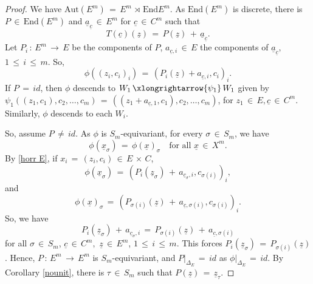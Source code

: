 \documentclass[12pt,reqno]{amsart}
\theoremstyle{definition}
\numberwithin{equation}{section}
\begin{document}
\begin{proof}
We have $\textrm{Aut}(E^{m})\,=\, E^{m}\,\rtimes\,\textrm{End}E^{m}$. As $\textrm{End}(E^{m})$ is discrete, there is $P\,\in\, \textrm{End}(E^{m})$ and  $\underline{a}_{\underline{c}}\,\in\, E^{m}$ for $\underline{c}\,\in\, C^{m}$ such that 
\begin{equation*}
T(\underline{c})(\underline{z})\,=\, P(\underline{z})\,+\, \underline{a}_{\underline{c}}.  
\end{equation*}
Let $P_{i}\,:\,E^{m}\,\longrightarrow\, E$ be the components of $P$, $a_{\underline{c},i}\,\in\, E$ the components of $\underline{a}_{\underline{c}},$ $1\,\leq\,i\,\leq\,m$. So, 
\begin{equation}\label{horr E}
\phi((z_{i},c_{i})_{i})\,=\, (P_{i}(\underline{z})+a_{\underline{c},i},c_{i})_{i}.    
\end{equation}
If $P\,=\,{id}$, then $\phi$ descends to $W_{1}\,\xlongrightarrow{\psi_{1}}\,W_{1}$ given by $\psi_{1}((z_{1},c_{1}), c_{2},\ldots,c_{m})\,=\, ((z_{1}+a_{\underline{c},1},c_{1}),c_{2},\ldots,c_{m})$, for $z_{1}\,\in\, E, \underline{c}\,\in\, C^{m}$. Similarly, $\phi$ descends to each $W_{i}$. 

So, assume $P\,\neq\,{id}$. As $\phi$ is $S_m$-equivariant, for every $\sigma\,\in\,S_{m}$, we have 
\begin{equation*}
\phi(\underline{x}_{\sigma})\,=\, \phi(\underline{x})_{\sigma} \quad \textrm{for all}\,\, \underline{x}\,\in\, X^{m}.
\end{equation*}
By \eqref{horr E}, if $x_{i}\,=\, (z_{i},c_{i})\,\in\, E\,\times\,C$,
\begin{equation*}
\phi(\underline{x}_{\sigma})\,=\, (P_{i}(\underline{z}_{\sigma})\,+\, a_{\underline{c}_{\sigma},i}, c_{\sigma(i)})_{i},    
\end{equation*}
and
\begin{equation*}
\phi(\underline{x})_{\sigma}\,=\, (P_{\sigma(i)}(\underline{z})\,+\, a_{\underline{c},\sigma(i)}, c_{\sigma(i)} )_{i}.   
\end{equation*}
 So, we have
\begin{equation*}
P_{i}(\underline{z}_{\sigma})\,+\, a_{\underline{c}_{\sigma},i}\,=\, P_{\sigma(i)}(\underline{z})\,+\, a_{\underline{c}, \sigma(i)} 
\end{equation*}
for all $\sigma\,\in\, S_{m}$, $\underline{c}\,\in\, C^{m},$ $ \underline{z}\,\in\, E^{m}$, $1\,\leq\,i\,\leq\, m$. This forces
$P_{i}(\underline{z}_{\sigma})\,=\, P_{\sigma(i)}(\underline{z})$. Hence, $P\,:\, E^{m}\,\longrightarrow\, E^{m}$ is $S_{m}$-equivariant, and $P|_{\Delta_{E}}\,=\,{id}$ as $\phi{|_{\Delta_{E}}}\,=\,{id}$. By Corollary \ref{nounit}, there is $\tau\,\in\, S_{m}$ such that $P(\underline{z})\,=\, \underline{z}_{\tau}$.


\end{proof}
\end{document}
